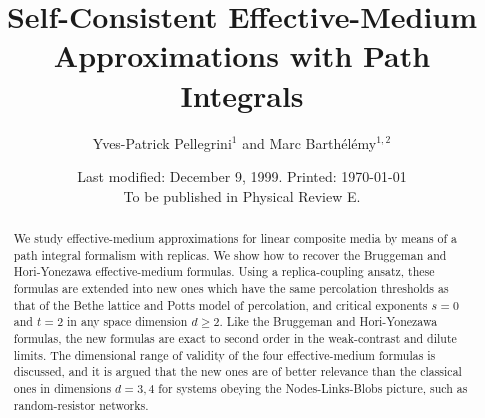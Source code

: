 
\newcommand\sigmabf{\text{\boldmath$\sigma$}}
\newcommand\Sigmasf{{\mathsf\Sigma}}
\newcommand\nablabf{\text{\boldmath$\nabla$}}
\newcommand\lambdabf{\text{\boldmath$\lambda$}}
\newcommand\dbf{\text{\boldmath$d$}}
\newcommand\iu{\underline{i}}
\newcommand\ju{\underline{j}}
\newcommand\be{\begin{equation}}
\newcommand\ee{\end{equation}}
\newcommand\ddx{d^d\! x\,}



\draft

\title{Self-Consistent Effective-Medium Approximations with Path Integrals}

\author{Yves-Patrick Pellegrini$^1$ and Marc Barth\'{e}l\'{e}my$^{1,2}$}

\address{ $^1$ Service de Physique de la Mati\`{e}re Condens\'{e}e, \\  Commissariat \`{a} l'Energie Atomique,\\  BP12, 91680 Bruy\`{e}res-le-Ch\^{a}tel, France.\\  $^2$ Center for Polymer Studies and Dept. of Physics,  Boston University, Boston, MA 02215.}

\date{Last modified: December 9, 1999. Printed: \today\\ To be published in Physical Review E.}

\maketitle

\begin{abstract}
We study effective-medium approximations for linear composite media
by means of a path integral formalism with replicas.
We show how to recover the Bruggeman
and Hori-Yonezawa effective-medium formulas.
Using a replica-coupling ansatz,
these formulas are extended into new ones
which have the same percolation thresholds as that of the Bethe
lattice and Potts model of percolation,
and critical exponents $s=0$
and $t=2$ in any space dimension $d\geq 2$.
Like the Bruggeman and Hori-Yonezawa formulas, the new formulas
are exact to second order in the weak-contrast and dilute limits.
The dimensional range of validity of the four effective-medium
formulas is discussed, and it is argued that the new ones are
of better relevance than the classical ones in dimensions $d=3,4$
for systems obeying the Nodes-Links-Blobs picture, such as
random-resistor networks.
\end{abstract}

